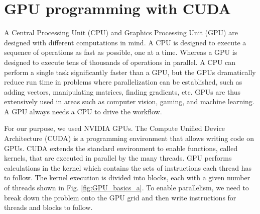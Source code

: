 \section{GPU programming with CUDA {\cpp} }%

A Central Processing Unit (CPU) and Graphics Processing Unit (GPU) are designed with different computations in mind. A CPU is designed to execute a sequence of operations as fast as possible, one at a time. Whereas a GPU is designed to execute tens of thousands of operations in parallel. A CPU can perform a single task significantly faster than a GPU, but the GPUs dramatically reduce run time in problems where parallelization can be established, such as adding vectors, manipulating matrices, finding gradients, etc. GPUs are thus extensively used in areas such as computer vision, gaming, and machine learning. A GPU always needs a CPU to drive the workflow. 

For our purpose, we used NVIDIA GPUs. The Compute Unified Device Architecture (CUDA) is a programming environment that allows writing {\cpp} code on GPUs. CUDA extends the standard {\cpp} environment to enable functions, called kernels, that are executed in parallel by the many threads. GPU performs calculations in the kernel which contains the sets of instructions each thread has to follow. The kernel execution is divided into blocks, each with a given number of threads shown in Fig. \ref{fig:GPU_basics_a}. To enable parallelism, we need to break down the problem onto the GPU grid and then write instructions for threads and blocks to follow.

